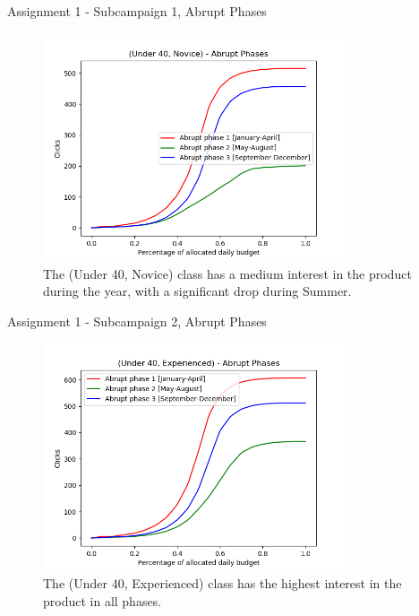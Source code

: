 \documentclass[11pt]{beamer}
\begin{document}
\begin{frame}{Assignment 1 - Subcampaign 1, Abrupt Phases}
\begin{figure}[hbtp]
\centering
\includegraphics[width=0.8\textwidth]{images/subcampaign_2_abrupt_phases.png}
\caption{The (Under 40, Novice) class has a medium interest in the product during the year, with a significant drop during Summer.}
\end{figure}
\end{frame}

\begin{frame}{Assignment 1 - Subcampaign 2, Abrupt Phases}
\begin{figure}[hbtp]
\centering
\includegraphics[width=0.8\textwidth]{images/subcampaign_3_abrupt_phases.png}
\caption{The (Under 40, Experienced) class has the highest interest in the product in all phases.}
\end{figure}
\end{frame}
\end{document}
